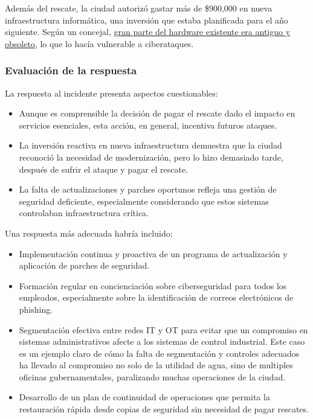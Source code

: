 Además del rescate, la ciudad autorizó gastar más de \$900,000 en nueva infraestructura informática, una inversión que estaba planificada para el año siguiente. Según un concejal, \ul{gran parte del hardware existente era antiguo y obsoleto}, lo que lo hacía vulnerable a ciberataques.

\subsubsection{Evaluación de la respuesta}
La respuesta al incidente presenta aspectos cuestionables:

\begin{itemize}
    \item Aunque es comprensible la decisión de pagar el rescate dado el impacto en servicios esenciales, esta acción, en general, incentiva futuros ataques.
    
    \item La inversión reactiva en nueva infraestructura demuestra que la ciudad reconoció la necesidad de modernización, pero lo hizo demasiado tarde, después de sufrir el ataque y pagar el rescate.
    
    \item La falta de actualizaciones y parches oportunos refleja una gestión de seguridad deficiente, especialmente considerando que estos sistemas controlaban infraestructura crítica.
\end{itemize}

Una respuesta más adecuada habría incluido:

\begin{itemize}
    \item Implementación continua y proactiva de un programa de actualización y aplicación de parches de seguridad.
    
    \item Formación regular en concienciación sobre ciberseguridad para todos los empleados, especialmente sobre la identificación de correos electrónicos de phishing.
    
    \item Segmentación efectiva entre redes IT y OT para evitar que un compromiso en sistemas administrativos afecte a los sistemas de control industrial.
    Este caso es un ejemplo claro de cómo la falta de segmentación y controles adecuados ha llevado al compromiso no solo de la utilidad de agua, sino de multiples oficinas gubernamentales, paralizando muchas operaciones de la ciudad.
    
    \item Desarrollo de un plan de continuidad de operaciones que permita la restauración rápida desde copias de seguridad sin necesidad de pagar rescates.
\end{itemize}


